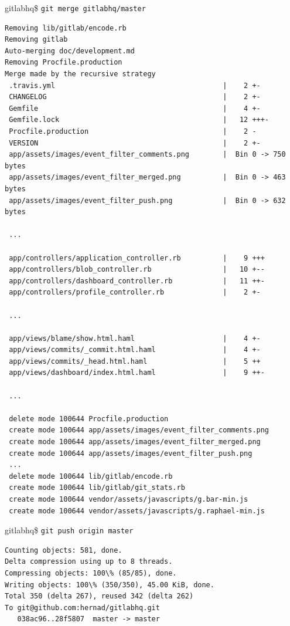 \documentclass[times, utf8, seminar]{fit}
\begin{document}
gitlabhq\$ \verb+git merge gitlabhq/master+
\begin{lstlisting}
Removing lib/gitlab/encode.rb
Removing gitlab
Auto-merging doc/development.md
Removing Procfile.production
Merge made by the recursive strategy
 .travis.yml                                        |    2 +-
 CHANGELOG                                          |    2 +-
 Gemfile                                            |    4 +-
 Gemfile.lock                                       |   12 +++-
 Procfile.production                                |    2 -
 VERSION                                            |    2 +-
 app/assets/images/event_filter_comments.png        |  Bin 0 -> 750 bytes
 app/assets/images/event_filter_merged.png          |  Bin 0 -> 463 bytes
 app/assets/images/event_filter_push.png            |  Bin 0 -> 632 bytes
 
 ...

 app/controllers/application_controller.rb          |    9 +++
 app/controllers/blob_controller.rb                 |   10 +--
 app/controllers/dashboard_controller.rb            |   11 ++-
 app/controllers/profile_controller.rb              |    2 +-

 ...

 app/views/blame/show.html.haml                     |    4 +-
 app/views/commits/_commit.html.haml                |    4 +-
 app/views/commits/_head.html.haml                  |    5 ++
 app/views/dashboard/index.html.haml                |    9 ++-
 
 ... 
 
 delete mode 100644 Procfile.production
 create mode 100644 app/assets/images/event_filter_comments.png
 create mode 100644 app/assets/images/event_filter_merged.png
 create mode 100644 app/assets/images/event_filter_push.png
 ...
 delete mode 100644 lib/gitlab/encode.rb
 create mode 100644 lib/gitlab/git_stats.rb
 create mode 100644 vendor/assets/javascripts/g.bar-min.js
 create mode 100644 vendor/assets/javascripts/g.raphael-min.js
\end{lstlisting}

gitlabhq\$ \verb+git push origin master+

\begin{lstlisting}
Counting objects: 581, done.
Delta compression using up to 8 threads.
Compressing objects: 100\% (85/85), done.
Writing objects: 100\% (350/350), 45.00 KiB, done.
Total 350 (delta 267), reused 342 (delta 262)
To git@github.com:hernad/gitlabhq.git
   038ac96..28f5807  master -> master
\end{lstlisting}
\end{document}
